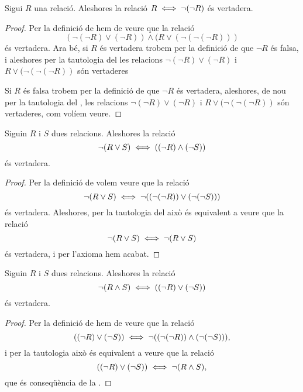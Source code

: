 \documentclass[../../Main.tex]{subfiles}
\begin{document}
	\begin{tautology}
		\label{taut:R és equivalent a no no R}
		Sigui \(R\) una relació. Aleshores la relació \(R\iff\lnot(\lnot R)\) és vertadera.
		\begin{proof}
			Per la definició de  hem de veure que la relació
			\[(\lnot(\lnot R)\lor(\lnot R))\land(R\lor(\lnot(\lnot(\lnot R)))\]
			és vertadera. Ara bé, si \(R\) és vertadera trobem per la definició de  que \(\lnot R\) és falsa, i aleshores per la tautologia del  les relacions \(\lnot(\lnot R)\lor(\lnot R)\) i \(R\lor(\lnot(\lnot(\lnot R))\) són vertaderes
			
			Si \(R\) és falsa trobem per la definició de  que \(\lnot R\) és vertadera, aleshores, de nou per la tautologia del , les relacions \(\lnot(\lnot R)\lor(\lnot R)\) i \(R\lor(\lnot(\lnot(\lnot R))\) són vertaderes, com volíem veure.
		\end{proof}
	\end{tautology}
	\begin{tautology}
		\label{taut:primera llei de De Morgan}
		Siguin \(R\) i \(S\) dues relacions. Aleshores la relació
		\[\lnot(R\lor S)\iff((\lnot R)\land(\lnot S))\]
		és vertadera.
		\begin{proof}
			Per la definició de  volem veure que la relació
			\[\lnot(R\lor S)\iff\lnot((\lnot(\lnot R))\lor(\lnot(\lnot S)))\]
			és vertadera. Aleshores, per la tautologia del  això és equivalent a veure que la relació
			\[\lnot(R\lor S)\iff\lnot(R\lor S)\]
			és vertadera, i per l'axioma  hem acabat.
		\end{proof}
	\end{tautology}
	\begin{tautology}
		\label{taut:segona llei de De Morgan}
		Siguin \(R\) i \(S\) dues relacions. Aleshores la relació
		\[\lnot(R\land S)\iff((\lnot R)\lor(\lnot S))\]
		és vertadera.
		\begin{proof}
			Per la definició de  hem de veure que la relació
			\[((\lnot R)\lor(\lnot S))\iff\lnot((\lnot(\lnot R))\land(\lnot (\lnot S))),\]
			i per la tautologia  això és equivalent a veure que la relació
			\[((\lnot R)\lor(\lnot S))\iff\lnot(R\land S),\]
			que és conseqüència de la \myref{taut:primera llei de De Morgan}.
		\end{proof}
	\end{tautology}
\end{document}

